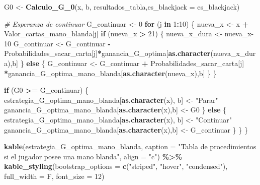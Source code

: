\documentclass[12pt,a4paper,]{book}
\newenvironment{Shaded}{\begin{snugshade}}{\end{snugshade}}
\newcommand{\AttributeTok}[1]{\textcolor[rgb]{0.13,0.29,0.53}{#1}}
\newcommand{\CommentTok}[1]{\textcolor[rgb]{0.56,0.35,0.01}{\textit{#1}}}
\newcommand{\ControlFlowTok}[1]{\textcolor[rgb]{0.13,0.29,0.53}{\textbf{#1}}}
\newcommand{\DecValTok}[1]{\textcolor[rgb]{0.00,0.00,0.81}{#1}}
\newcommand{\FunctionTok}[1]{\textcolor[rgb]{0.13,0.29,0.53}{\textbf{#1}}}
\newcommand{\NormalTok}[1]{#1}
\newcommand{\OtherTok}[1]{\textcolor[rgb]{0.56,0.35,0.01}{#1}}
\newcommand{\SpecialCharTok}[1]{\textcolor[rgb]{0.81,0.36,0.00}{\textbf{#1}}}
\newcommand{\StringTok}[1]{\textcolor[rgb]{0.31,0.60,0.02}{#1}}
\numberwithin{dummy}{section}
\theoremstyle{ocrenumbox}
\theoremstyle{blacknumex}
\theoremstyle{blacknumbox}
\theoremstyle{ocrenum}
\theoremstyle{ocrenum}
\begin{document}
\begin{Shaded}
\begin{Highlighting}[]
\NormalTok{    G0 }\OtherTok{\textless{}{-}} \FunctionTok{Calculo\_G\_0}\NormalTok{(x, b, resultados\_tabla,}\AttributeTok{es\_blackjack =}\NormalTok{ es\_blackjack)}
    
    \CommentTok{\# Esperanza de continuar}
\NormalTok{    G\_continuar }\OtherTok{\textless{}{-}} \DecValTok{0}
    \ControlFlowTok{for}\NormalTok{ (j }\ControlFlowTok{in} \DecValTok{1}\SpecialCharTok{:}\DecValTok{10}\NormalTok{) \{}
\NormalTok{      nueva\_x }\OtherTok{\textless{}{-}}\NormalTok{ x }\SpecialCharTok{+}\NormalTok{ Valor\_cartas\_mano\_blanda[j]}
      \ControlFlowTok{if}\NormalTok{ (nueva\_x }\SpecialCharTok{\textgreater{}} \DecValTok{21}\NormalTok{) \{}
\NormalTok{        nueva\_x\_dura }\OtherTok{\textless{}{-}}\NormalTok{ nueva\_x}\DecValTok{{-}10}
\NormalTok{        G\_continuar }\OtherTok{\textless{}{-}}\NormalTok{ G\_continuar }\SpecialCharTok{{-}}\NormalTok{ Probabilidades\_sacar\_carta[j]}\SpecialCharTok{*}\NormalTok{ganancia\_G\_optima[}\FunctionTok{as.character}\NormalTok{(nueva\_x\_dura),b]}
\NormalTok{      \} }\ControlFlowTok{else}\NormalTok{ \{}
\NormalTok{        G\_continuar }\OtherTok{\textless{}{-}}\NormalTok{ G\_continuar }\SpecialCharTok{+}\NormalTok{ Probabilidades\_sacar\_carta[j] }\SpecialCharTok{*}\NormalTok{ganancia\_G\_optima\_mano\_blanda[}\FunctionTok{as.character}\NormalTok{(nueva\_x),b] }
\NormalTok{      \}}
\NormalTok{    \}}
    
    \ControlFlowTok{if}\NormalTok{ (G0 }\SpecialCharTok{\textgreater{}=}\NormalTok{ G\_continuar) \{}
\NormalTok{      estrategia\_G\_optima\_mano\_blanda[}\FunctionTok{as.character}\NormalTok{(x), b] }\OtherTok{\textless{}{-}} \StringTok{"Parar"}
\NormalTok{      ganancia\_G\_optima\_mano\_blanda[}\FunctionTok{as.character}\NormalTok{(x),b] }\OtherTok{\textless{}{-}}\NormalTok{ G0}
\NormalTok{    \} }\ControlFlowTok{else}\NormalTok{ \{}
\NormalTok{      estrategia\_G\_optima\_mano\_blanda[}\FunctionTok{as.character}\NormalTok{(x), b] }\OtherTok{\textless{}{-}} \StringTok{"Continuar"}
\NormalTok{      ganancia\_G\_optima\_mano\_blanda[}\FunctionTok{as.character}\NormalTok{(x),b] }\OtherTok{\textless{}{-}}\NormalTok{ G\_continuar}
\NormalTok{    \}}
\NormalTok{  \}}
\NormalTok{\}}

\FunctionTok{kable}\NormalTok{(estrategia\_G\_optima\_mano\_blanda, }
      \AttributeTok{caption =} \StringTok{"Tabla de procedimientos si el jugador posee una mano blanda"}\NormalTok{,}
      \AttributeTok{align =} \StringTok{"c"}\NormalTok{) }\SpecialCharTok{\%\textgreater{}\%}
  \FunctionTok{kable\_styling}\NormalTok{(}\AttributeTok{bootstrap\_options =} \FunctionTok{c}\NormalTok{(}\StringTok{"striped"}\NormalTok{, }\StringTok{"hover"}\NormalTok{, }\StringTok{"condensed"}\NormalTok{),}
                \AttributeTok{full\_width =}\NormalTok{ F, }\AttributeTok{font\_size =} \DecValTok{12}\NormalTok{)}


\end{Highlighting}
\end{Shaded}
\end{document}
